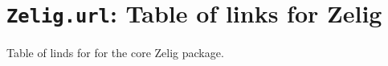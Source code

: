  \section{{\tt Zelig.url}: Table of links for Zelig}\label{ss:Zelig.url}
\begin{Description}\relax
Table of linds for  for the core Zelig package.
\end{Description}


